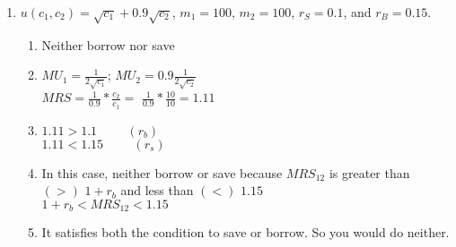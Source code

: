 \documentclass[11pt]{article}
\begin{document}
\begin{enumerate}
\begin{enumerate}
        \item $u(c_{1},c_{2})=\sqrt{c_{1}}+0.9\sqrt{c_{2}}$, $m_{1}=100$, $m_{2}=100$, $r_{S}=0.1$, and $r_{B}=0.15$.
        \begin{enumerate}
            \item Neither borrow nor save
            \item $MU_1 = \frac{1}{2\sqrt{c_1}}$; $MU_2 = 0.9\frac{1}{2\sqrt{c_2}}$\\
            $MRS = \frac{1}{0.9} * \frac{c_2}{c_1} = $ $\frac{1}{0.9} *\frac{10}{10} = 1.11$
            \item $1.11 > 1.1 \hspace{1cm}(r_b)$
            \\$1.11<1.15\hspace{1cm}(r_s)$
            \item In this case, neither borrow or save because $MRS_{12}$ is greater than $(>)$ $1+r_b$ and less than $(<)$ $1.15$\\
            $1+r_b < MRS_{12} < 1.15$
            \item It satisfies both the condition to save or borrow. So you would do neither.
        \end{enumerate}
    \end{enumerate}


\end{enumerate}
\end{document}
